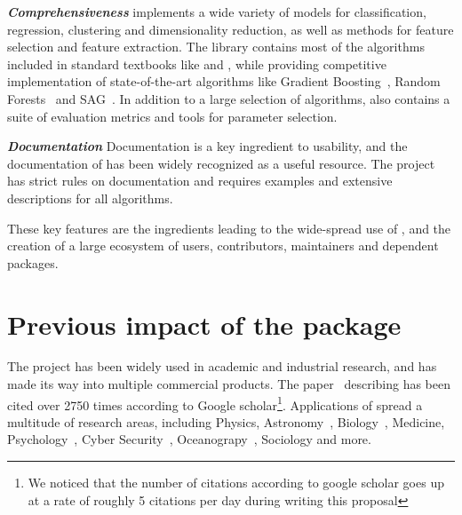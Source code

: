 \emph{\textbf{Comprehensiveness}} \sklearn{} implements a wide variety of models for classification,
regression, clustering and dimensionality reduction, as well as methods for feature
selection and feature extraction. The library contains most of the algorithms included
in standard textbooks like \textcite{bishop2001bishop} and
\textcite{friedman2001elements}, while providing competitive implementation of
state-of-the-art algorithms like Gradient
Boosting~\autocite{friedman2001greedy}, Random
Forests~\autocite{breiman2001random} and SAG~\autocite{roux2012stochastic}.  In
addition to a large selection of algorithms, \sklearn{} also contains a suite
of evaluation metrics and tools for parameter selection.

\emph{\textbf{Documentation}}
Documentation is a key ingredient to usability, and the documentation of \sklearn{}
has been widely recognized as a useful resource. The \sklearn{} project
has strict rules on documentation and requires examples and extensive descriptions
for all algorithms.

These key features are the ingredients leading to the wide-spread use of
\sklearn{}, and the creation of a large ecosystem of users, contributors,
maintainers and dependent packages.

\section{Previous impact of the \sklearn{} package}
The \sklearn{} project has been widely used in academic and industrial research,
and has made its way into multiple commercial products. The
paper~\autocite{pedregosa2011scikit} describing \sklearn{} has been cited over 2750 times
according to Google scholar\footnote{We noticed that the number of citations
according to google scholar goes up at a rate of roughly 5 citations per day
during writing this proposal}. Applications of \sklearn{} spread
a multitude of research areas, including Physics, Astronomy~\autocite{pereira2013spectrophotometric, bennett20141},
Biology~\autocite{misof2014phylogenomics, ritchie2014functional}, Medicine,
Psychology~\autocite{park2015automatic,doehrmann2013predicting}, Cyber
Security~\autocite{sahs2012machine},
Oceanograpy~\autocite{sunagawa2015structure}, Sociology and more.

